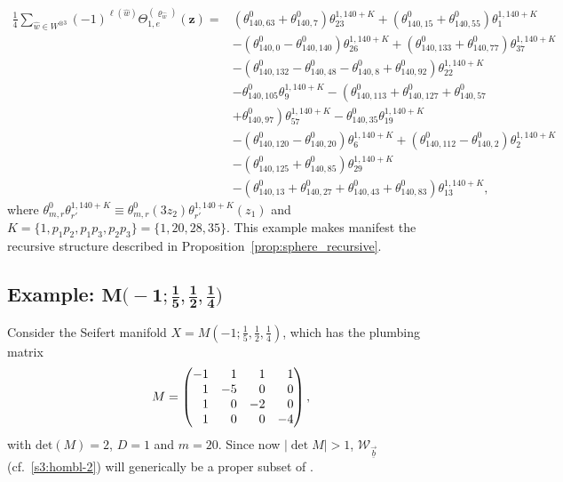 \documentclass[pdftex]{sigma}
\theoremstyle{definition}
\numberwithin{equation}{section}
\begin{document}
\begin{align}
\frac{1}{4}\sum_{\hat{w}\in W^{\otimes 3}}(-1)^{\ell(\hat{w})}\Theta^{(\varrho_{\hat{w}})}_{1,e}\left(\mathbf{z}\right)={}&{\left(\theta^{0}_{140,63} + \theta^{0}_{140,7}\right)} \theta^{1,140+K}_{23}
	+ {\left(\theta^{0}_{140,15} + \theta^{0}_{140,55}\right)} \theta^{1,140+K}_{1}\nonumber\\
		 &
	- {\left(\theta^{0}_{140,0} - \theta^{0}_{140,140}\right)} \theta^{1,140+K}_{26}
+ {\left(\theta^{0}_{140,133} + \theta^{0}_{140,77} \right)} \theta^{1,140+K}_{37} \nonumber\\
& 	- \left(\theta^{0}_{140,132} - \theta^{0}_{140,48} - \theta^{0}_{140,8} + \theta^{0}_{140,92} \right) \theta^{1,140+K}_{22}\nonumber\\
&
 - \theta^{0}_{140,105} \theta^{1,140+K}_{9} - \left(\theta^{0}_{140,113} + \theta^{0}_{140,127} + \theta^{0}_{140,57} \right.\nonumber\\
&
+ \left. \theta^{0}_{140,97} \right) \theta^{1,140+K}_{57}- \theta^{0}_{140,35} \theta^{1,140+K}_{19} \nonumber\\
&
- {\left(\theta^{0}_{140,120} - \theta^{0}_{140,20} \right)} \theta^{1,140+K}_{6}+ {\left(\theta^{0}_{140,112} - \theta^{0}_{140,2} \right)} \theta^{1,140+K}_{2} \nonumber\\
&
- {\left(\theta^{0}_{140,125} + \theta^{0}_{140,85} \right)} \theta^{1,140+K}_{29} \nonumber\\
&
- \left(\theta^{0}_{140,13} + \theta^{0}_{140,27} + \theta^{0}_{140,43} + \theta^{0}_{140,83} \right) \theta^{1,140+K}_{13},\label{eq:theta1_example1}
\end{align}
where $\theta^{0}_{m,r} \theta^{1,140+K}_{r'}
\equiv
\theta^{0}_{m,r} (3z_{2} )\theta^{1,140+K}_{r'}(z_{1} )$ and $K=\{ 1,p_{1}p_{2},p_{1}p_{3},p_{2}p_{3} \}=\{ 1,20,28,35 \}$. This example makes manifest the recursive structure described in Proposition~\ref{prop:sphere_recursive}.

\subsection[Example: M(-1;1/5,1/2,1/4)]{Example: $\boldsymbol{M\bigl(-1;\frac{1}{5},\frac{1}{2},\frac{1}{4}\bigr)}$}
Consider the Seifert manifold $X = M\left( -1;\frac{1}{5},\frac{1}{2},\frac{1}{4} \right)$, which has the plumbing matrix
\begin{equation*}
 M=\left(\begin{array}{@{}rrrr@{}}
-1 & 1 & 1 & 1 \\
1 & -5 & 0 & 0 \\
1 & 0 & -2 & 0 \\
1 & 0 & 0 & -4
\end{array}\right),
\end{equation*}
with $\mathrm{det}(M)=2$, $D=1$ and $m=20$. Since now $|\det M|>1$, $\mathcal{W}_{\vec{\underline{b}}}$ (cf.\ \eqref{s3:hombl-2}) will generically be a proper subset of .
\end{document}
